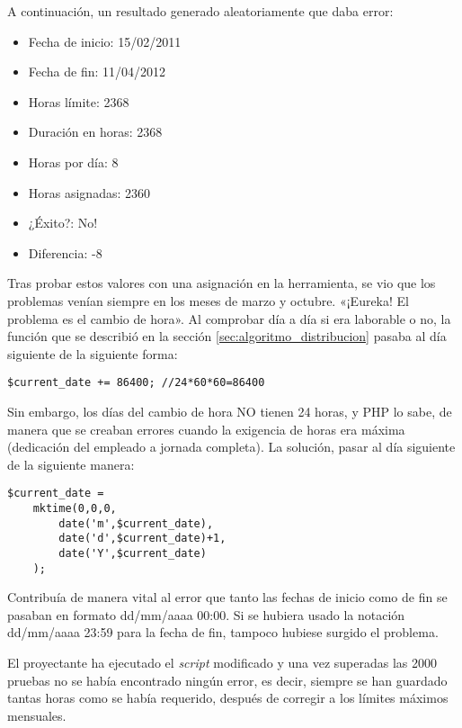A continuación, un resultado generado aleatoriamente que daba error:

\begin{itemize}
\item Fecha de inicio: 15/02/2011
\item Fecha de fin: 11/04/2012
\item Horas límite: 2368
\item Duración en horas: 2368
\item Horas por día: 8
\item Horas asignadas: 2360 
\item ¿Éxito?: No!
\item Diferencia: -8
\end{itemize}

Tras probar estos valores con una asignación en la herramienta, se vio que los
problemas venían siempre en los meses de marzo y octubre. «¡Eureka! El problema
es el cambio de hora». Al comprobar día a día si era laborable o no, la función
que se describió en la sección \ref{sec:algoritmo_distribucion} pasaba al día
siguiente de la siguiente forma:

\begin{lstlisting}
$current_date += 86400; //24*60*60=86400
\end{lstlisting}

Sin embargo, los días del cambio de hora NO tienen 24 horas, y PHP lo sabe, de
manera que se creaban errores cuando la exigencia de horas era máxima
(dedicación del empleado a jornada completa). La solución, pasar al día
siguiente de la siguiente manera:

\begin{lstlisting}
$current_date = 
	mktime(0,0,0,
		date('m',$current_date),
		date('d',$current_date)+1,
		date('Y',$current_date)
	);
\end{lstlisting}

Contribuía de manera vital al error que tanto las fechas de inicio como de fin
se pasaban en formato dd/mm/aaaa 00:00. Si se hubiera usado la notación
dd/mm/aaaa 23:59 para la fecha de fin, tampoco hubiese surgido el problema.

El proyectante ha ejecutado el \textit{script} modificado y una vez superadas
las 2000 pruebas no se había encontrado ningún error, es decir, siempre se han
guardado tantas horas como se había requerido, después de corregir a los
límites máximos mensuales.



